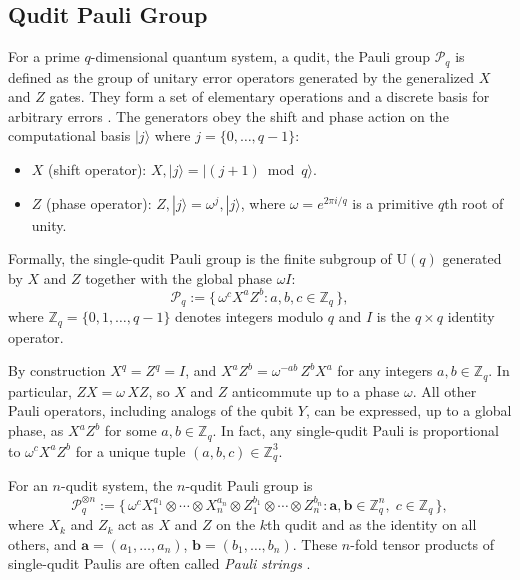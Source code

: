 \subsection{Qudit Pauli Group}
For a prime $q$-dimensional quantum system, a qudit, the Pauli group $\mathcal{P}_q$ is defined as the group of unitary error operators generated by the generalized $X$ and $Z$ gates. They form a set of elementary operations and a discrete basis for arbitrary errors \cite{Gottesman1999,Hostens2005,Wang2020,SarkarYoder2024}.
The generators obey the shift and phase action on the computational basis $|j\rangle$ where $j=\{0,\ldots,q-1\}$:

\begin{itemize}
    \item $X$ (shift operator): $X,|j\rangle = |(j+1)\bmod q\rangle$.

    \item $Z$ (phase operator): $Z,|j\rangle = \omega^j,|j\rangle$,
    where $\omega = e^{2\pi i/q}$ is a primitive $q$th root of unity.
\end{itemize}

Formally, the single-qudit Pauli group is the finite subgroup of $\mathrm{U}(q)$ generated by $X$ and $Z$ together with the global phase
$\omega I$:
\begin{equation}
  \mathcal{P}_q
  := \bigl\{\, \omega^c X^a Z^b : a,b,c \in \mathbb{Z}_q \,\bigr\},
\end{equation}
where $\mathbb{Z}_q = \{0,1,\dots,q-1\}$ denotes integers modulo $q$ and $I$ is the $q\times q$ identity operator.

By construction $X^q = Z^q = I$, and $X^a Z^b = \omega^{-ab}\, Z^b X^a$ for any integers $a,b \in \mathbb{Z}_q$. In particular, $Z X = \omega\, X Z$, so $X$ and $Z$ anticommute up to a
phase $\omega$. All other Pauli operators, including analogs of the qubit $Y$, can be expressed, up to a global phase, as $X^a Z^b$ for
some $a,b\in \mathbb{Z}_q$. In fact, any single-qudit Pauli is proportional to $\omega^c X^a Z^b$ for a unique tuple $(a,b,c)\in \mathbb{Z}_q^3$.

For an $n$-qudit system, the $n$-qudit Pauli group is
\begin{equation}
  \mathcal{P}_q^{\otimes n}
  := \bigl\{\, \omega^c
      X_1^{a_1} \otimes \cdots \otimes X_n^{a_n} \otimes
      Z_1^{b_1} \otimes \cdots \otimes Z_n^{b_n}
      : \mathbf{a},\mathbf{b} \in \mathbb{Z}_q^n,\;
        c \in \mathbb{Z}_q
     \,\bigr\},
\end{equation}
where $X_k$ and $Z_k$ act as $X$ and $Z$ on the $k$th qudit and as the identity on all others, and
$\mathbf{a}=(a_1,\dots,a_n)$, $\mathbf{b}=(b_1,\dots,b_n)$.
These $n$-fold tensor products of single-qudit Paulis are often called \emph{Pauli strings} \cite{Hostens2005,SarkarYoder2024}.
